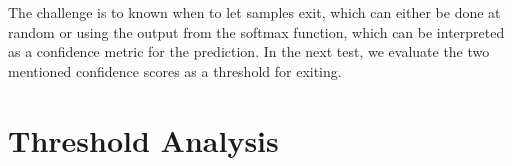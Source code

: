 The challenge is to known when to let samples exit, which can either be done at random or using the output from the softmax function, which can be interpreted as a confidence metric for the prediction. In the next test, we evaluate the two mentioned confidence scores as a threshold for exiting. 


%
%
%


\section{Threshold Analysis}

